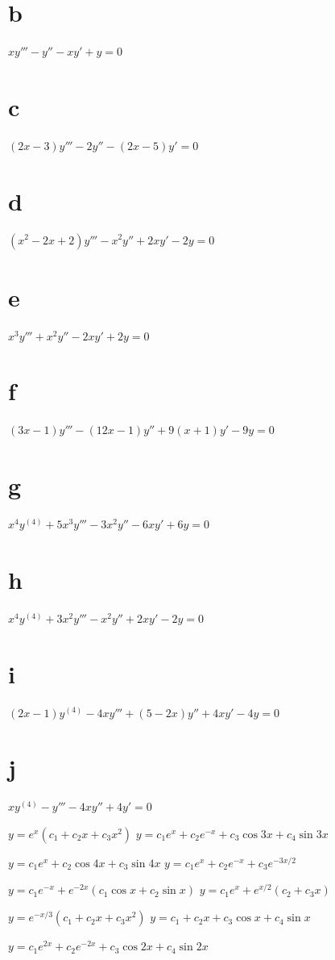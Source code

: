 \part{b}
$xy'''-y''-xy'+y=0$\;
\part{c} $(2x-3)y'''-2y''-(2x-5)y'=0$\;
\part{d} $(x^2-2x+2)y'''-x^2y''+2xy'-2y=0$\;
\part{e} $x^3y'''+x^2y''-2xy'+2y=0$\;
\part{f} $(3x-1)y'''-(12x-1)y''+9(x+1)y'-9y=0$\;
\part{g} $x^4y^{(4)}+5x^3y'''-3x^2y''-6xy'+6y=0$\;
\part{h} $x^4y^{(4)}+3x^2y'''-x^2y''+2xy'-2y=0$\;
\part{i} $(2x-1)y^{(4)}-4xy'''+(5-2x)y''+4xy'-4y=0$\;
\part{j} $xy^{(4)}-y'''-4xy''+4y'=0$\;



 $y=e^x(c_1+c_2x+c_3x^2)$\;
 $y=c_1e^x+c_2e^{-x}+c_3\cos3x+c_4\sin3x$

  $y=c_1e^x+c_2\cos4x+c_3\sin4x$\;
 $y=c_1e^x+c_2e^{-x}+c_3e^{-3x/2}$

$y=c_1e^{-x}+e^{-2x}(c_1\cos x+c_2\sin x)$\;
$y=c_1e^x+e^{x/2}(c_2+c_3x)$

 $y=e^{-x/3}(c_1+c_2x+c_3x^2)$\;
 $y=c_1+c_2x+c_3\cos x+c_4\sin x$

 $y=c_1e^{2x}+c_2e^{-2x}+c_3\cos2x+c_4\sin2x$\;

